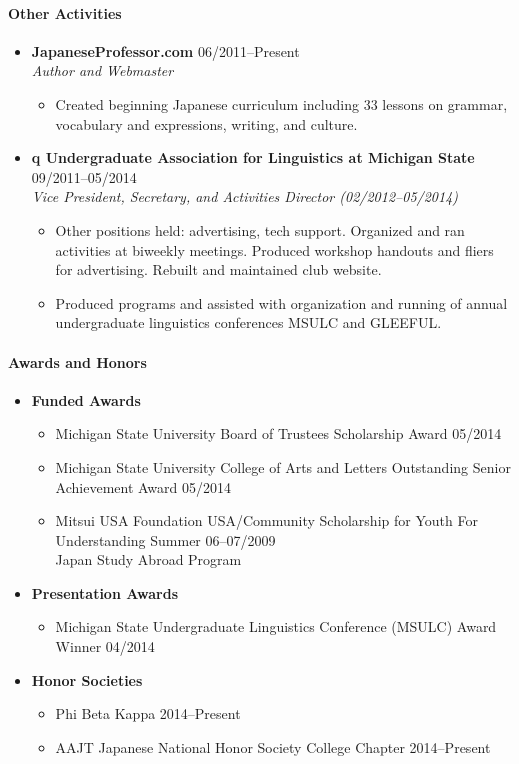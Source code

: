 \documentclass[10pt,oneside]{article}
\newenvironment{ressection}[1]{
	\paragraph{\Large#1}
	\begin{itemize}
}{
	\end{itemize}
}
\newcommand{\resbigitem}[4]{
	\item
	\textbf{#1} \hfill #2 \\
	\textit{#3} \hfill \textit{#4}
}
\newenvironment{ressubsec}[4]{
	\resbigitem{#1}{#2}{#3}{#4}
	\begin{itemize}
}{
	\end{itemize}
}
\newenvironment{reslist}[1]{
	\item{\textbf{#1}}
	\begin{itemize}
}{
	\end{itemize}
}
\begin{document}
\begin{ressection}{Other Activities}
	\begin{ressubsec}{JapaneseProfessor.com}{06/2011--Present}{Author and Webmaster}{}
		\item{Created beginning Japanese curriculum including 33 lessons on grammar, vocabulary and expressions, writing, and culture.}
	\end{ressubsec}
	
	\begin{ressubsec}{q Undergraduate Association for Linguistics at Michigan State}
			{09/2011--05/2014}
			{Vice President, Secretary, and Activities Director (02/2012--05/2014)}
			{}
		\item{Other positions held: advertising, tech support. Organized and ran activities at biweekly meetings. Produced workshop handouts and fliers for advertising. Rebuilt and maintained club website.}
		\item{Produced programs and assisted with organization and running of annual undergraduate linguistics conferences MSULC and GLEEFUL. }
	\end{ressubsec}
\end{ressection}


\begin{ressection}{Awards and Honors}
	\begin{reslist}{Funded Awards}
		\item{Michigan State University Board of Trustees Scholarship Award \hfill 05/2014}
		\item{Michigan State University College of Arts and Letters Outstanding Senior Achievement Award \hfill 05/2014}
		\item{Mitsui USA Foundation USA/Community Scholarship for Youth For Understanding Summer \hfill 06--07/2009 \\ Japan Study Abroad Program}
	\end{reslist}
	
	\begin{reslist}{Presentation Awards}
		\item{Michigan State Undergraduate Linguistics Conference (MSULC) Award Winner \hfill 04/2014}
	\end{reslist}
	
	\begin{reslist}{Honor Societies}
		\item{Phi Beta Kappa \hfill 2014--Present}
		\item{AAJT Japanese National Honor Society College Chapter \hfill 2014--Present}	
	\end{reslist}
\end{ressection}
\end{document}
